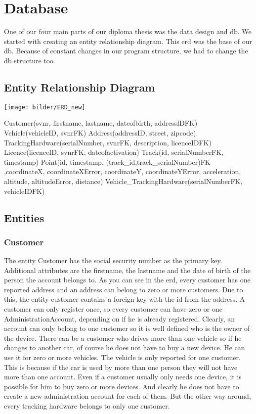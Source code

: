 \chapter{Database}
One of our four main parts of our diploma thesis was the data design and \gls{db}. We started with creating an entity relationship diagram. This \gls{erd} was the base of our \gls{db}. Because of constant changes in our program structure, we had to change the \gls{db} structure too. 
\section{Entity Relationship Diagram}
\begin{center}
\texttt{[image: bilder/ERD\_new]}
\end{center} 
Customer(svnr, firstname, lastname, dateofbirth, addressIDFK)\newline
Vehicle(vehicleID, svnrFK)\newline
Address(addressID, street, zipcode)\newline
TrackingHardware(serialNumber, svnrFK, description, licenceIDFK)\newline
Licence(licenceID, svnrFK, dateofactivation)\newline
Track(id, serialNumberFK, timestamp)\newline
Point(id, timestamp, (track\_id,track\_serialNumber)FK ,coordinateX, coordinateXError, coordinateY, coordinateYError, acceleration, altitude, altitudeError, distance)\newline
Vehicle\_TrackingHardware(serialNumberFK, vehicleIDFK)
\section{Entities}
\subsection{Customer}
The entity Customer has the social security number as the primary key. Additional attributes are the firstname, the lastname and the date of birth of the person the account belongs to. As you can see in the \gls{erd}, every customer has one reported address and an address can belong to zero or more customers. Due to this, the entity customer contains a foreign key with the id from the address. A customer can only register once, so every customer can have zero or one AdministrationAccount, depending on if he is already registered. Clearly, an account can only belong to one customer so it is well defined who is the owner of the device. There can be a customer who drives more than one vehicle so if he changes to another car, of course he does not have to buy a new device. He can use it for zero or more vehicles. The vehicle is only reported for one customer. This is because if the car is used by more than one person they will not have more than one account. Even if a customer usually only needs one device, it is possible for him to buy zero or more devices. And clearly he does not have to create a new administration account for each of them. But the other way around, every tracking hardware belongs to only one customer.
